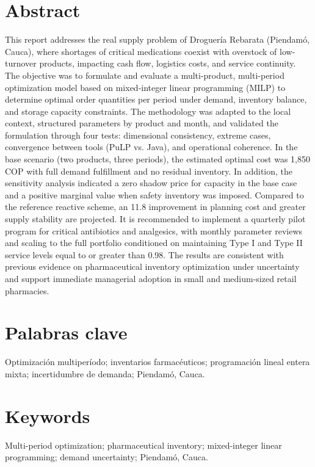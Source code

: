 \documentclass[12pt,letterpaper]{article}
\begin{document}
\section*{Abstract}
This report addresses the real supply problem of Droguería Rebarata (Piendamó, Cauca), where shortages of critical medications coexist with overstock of low-turnover products, impacting cash flow, logistics costs, and service continuity. The objective was to formulate and evaluate a multi-product, multi-period optimization model based on mixed-integer linear programming (MILP) to determine optimal order quantities per period under demand, inventory balance, and storage capacity constraints. The methodology was adapted to the local context, structured parameters by product and month, and validated the formulation through four tests: dimensional consistency, extreme cases, convergence between tools (PuLP vs. Java), and operational coherence. In the base scenario (two products, three periods), the estimated optimal cost was 1,850 COP with full demand fulfillment and no residual inventory. In addition, the sensitivity analysis indicated a zero shadow price for capacity in the base case and a positive marginal value when safety inventory was imposed. Compared to the reference reactive scheme, an 11.8 improvement in planning cost and greater supply stability are projected. It is recommended to implement a quarterly pilot program for critical antibiotics and analgesics, with monthly parameter reviews and scaling to the full portfolio conditioned on maintaining Type I and Type II service levels equal to or greater than 0.98. The results are consistent with previous evidence on pharmaceutical inventory optimization under uncertainty and support immediate managerial adoption in small and medium-sized retail pharmacies.


\section*{Palabras clave}
Optimización multiperíodo; inventarios farmacéuticos; programación lineal entera mixta; incertidumbre de demanda; Piendamó, Cauca.

\section*{Keywords}
Multi-period optimization; pharmaceutical inventory; mixed-integer linear programming; demand uncertainty; Piendamó, Cauca.
\end{document}

